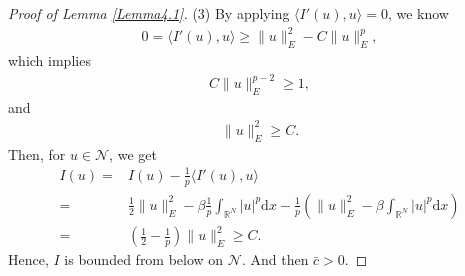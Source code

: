 \documentclass[10pt,a4paper]{amsart}
\begin{document}
\begin{proof}[Proof of Lemma \ref{Lemma4.1}]
(3)
By applying $\langle I'(u),u\rangle=0$, we know
\begin{equation*}
\begin{aligned}
0
=\langle I'(u),u\rangle\geqslant \|u\|_{E}^{2}
-C\|u\|_{E}^{p},
\end{aligned}
\end{equation*}
which implies
\begin{equation*}
\begin{aligned}
C\|u\|_{E}^{p-2}
\geqslant
1,
\end{aligned}
\end{equation*}
and
\begin{equation*}
\begin{aligned}
\|u\|_{E}^{2}
\geqslant C.
\end{aligned}
\end{equation*}
Then, for $u\in \mathcal{N}$, we get
\begin{equation*}\label{36}
\begin{aligned}
I(u)
=&
I(u)-\frac{1}{p}\langle I'(u),u\rangle\\
=&\frac{1}{2}\|u\|_{E}^{2}
-\beta\frac{1}{p}\int_{\mathbb{R}^{N}}|u|^{p}\mathrm{d}x
-\frac{1}{p}
\left(
\|u\|_{E}^{2}
-\beta\int_{\mathbb{R}^{N}}|u|^{p}\mathrm{d}x
\right)\\
=&
\left(\frac{1}{2}-\frac{1}{ p}\right)
\|u\|_{E}^{2}
\geqslant
C.
\end{aligned}
\end{equation*}
Hence, $I$ is bounded from below on $\mathcal{N}$. And then $\bar{c}>0$.






\end{proof}
\end{document}
